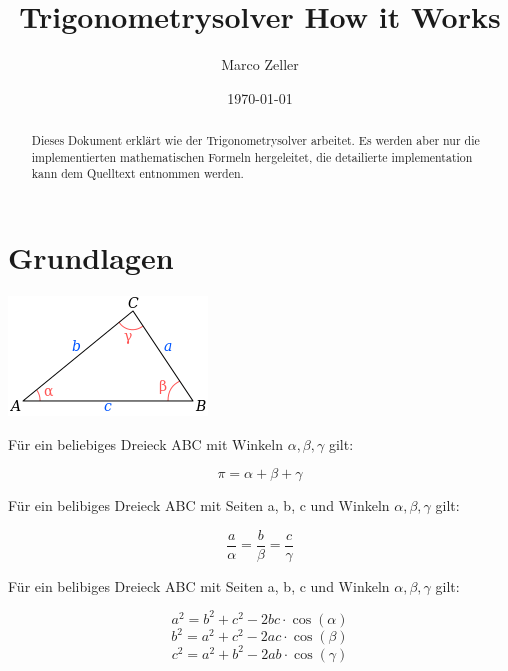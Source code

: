\documentclass[ngerman,12pt]{scrartcl}
\title{Trigonometrysolver How it Works}
\author{Marco Zeller}
\date{\today}
\begin{document}
\maketitle

\begin{abstract}
Dieses Dokument erklärt wie der Trigonometrysolver arbeitet. Es werden aber nur die implementierten mathematischen Formeln hergeleitet, die detailierte implementation kann dem Quelltext entnommen werden.
\end{abstract}


\section{Grundlagen}

\includegraphics[scale=0.3]{Triangle_with_notations_2.png}

\begin{theom}\label{sum}
Für ein beliebiges Dreieck ABC mit Winkeln $\alpha, \beta, \gamma$ gilt:

$$\pi = \alpha + \beta + \gamma$$
\end{theom}


\begin{theom}[Sinussatz]\label{sin}
Für ein belibiges Dreieck ABC mit Seiten a, b, c und Winkeln $\alpha, \beta, \gamma$ gilt:

$$ \frac{a}{\alpha} = \frac{b}{\beta} = \frac{c}{\gamma} $$
\end{theom}

\begin{theom}[Cosinussatz]\label{cos}
Für ein belibiges Dreieck ABC mit Seiten a, b, c und Winkeln $\alpha, \beta, \gamma$ gilt:

\begin{equation}
a^2 = b^2 + c^2 -2  b  c \cdot \cos(\alpha)
\end{equation}\label{cosa}
\begin{equation}
b^2 = a^2 + c^2 -2  a  c \cdot \cos(\beta)
\end{equation}\label{cosb}
\begin{equation}
c^2 = a^2 + b^2 -2  a  b \cdot \cos(\gamma)
\end{equation}\label{cosc}
\end{theom}
\end{document}
